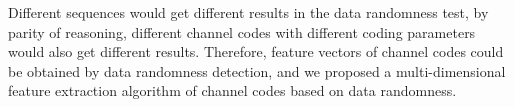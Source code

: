 \documentclass[conference]{IEEEtran}
\begin{document}
Different sequences would get different results in the data randomness test, by parity of reasoning, different channel codes with different coding parameters would also get different results. Therefore, feature vectors of channel codes could be obtained by data randomness detection, and we proposed a multi-dimensional feature extraction algorithm of channel codes based on data randomness. 

\end{document}
